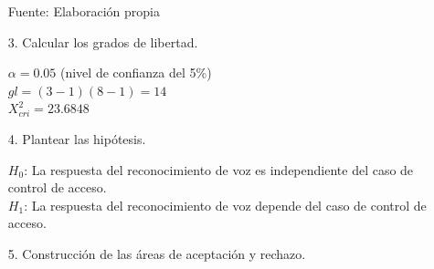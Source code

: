 \begin{enumerate}
\begin{center}
\begin{table}[H]
\centering
\caption{\small{Tabla de frecuencias esperadas.}}
\label{table:tabla4.36}
\vskip 0.2cm
\begin{center}
\vskip 0.2cm
{\small{Fuente: Elaboración propia}}
\end{center}
\end{table}
\end{center}

\item[3.] Calcular los grados de libertad.
\par
$\alpha = 0.05$ (nivel de confianza del 5\%) \\
$gl = (3-1)(8-1) = 14$ \\
$X^{2}_{cri} = 23.6848$ 

\item[4.]Plantear las hipótesis.
\par
$H_{0}$: La respuesta del reconocimiento de voz es independiente del caso de control de acceso. \\
$H_{1}$: La respuesta del reconocimiento de voz depende del caso de control de acceso.

\item[5.] Construcción de las áreas de aceptación y rechazo.


\end{enumerate}
